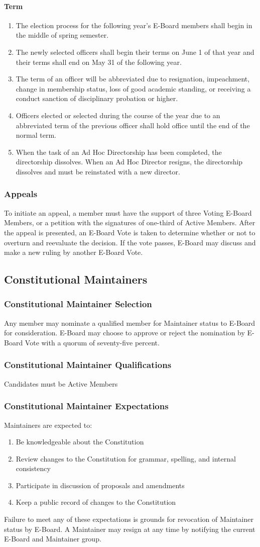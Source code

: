 \documentclass{article}
\newcommand{\asection}[1]{\subsection{#1} \label{#1}}
\newcommand{\asubsection}[1]{\subsubsection{#1} \label{#1}}
\newcommand{\asubsubsection}[1]{\paragraph{#1} \label{#1}}
\begin{document}
\asubsubsection{Term}
\begin{enumerate}
	\item The election process for the following year's E-Board members shall begin in the middle of spring semester.
	\item The newly selected officers shall begin their terms on June 1 of that year and their terms shall end on May 31 of the following year.
	\item The term of an officer will be abbreviated due to resignation, impeachment, change in membership status, loss of good academic standing, or receiving a conduct sanction of disciplinary probation or higher.
	\item Officers elected or selected during the course of the year due to an abbreviated term of the previous officer shall hold office until the end of the normal term.
	\item When the task of an Ad Hoc Directorship has been completed, the directorship dissolves.
	      When an Ad Hoc Director resigns, the directorship dissolves and must be reinstated with a new director.
\end{enumerate}

\asubsection{Appeals}
To initiate an appeal, a member must have the support of three Voting E-Board Members, or a petition with the signatures of one-third of Active Members.
After the appeal is presented, an E-Board Vote is taken to determine whether or not to overturn and reevaluate the decision.
If the vote passes, E-Board may discuss and make a new ruling by another E-Board Vote.

\asection{Constitutional Maintainers}

\asubsection{Constitutional Maintainer Selection}
Any member may nominate a qualified member for Maintainer status to E-Board for consideration.
E-Board may choose to approve or reject the nomination by E-Board Vote with a quorum of seventy-five percent.

\asubsection{Constitutional Maintainer Qualifications}
Candidates must be Active Members

\asubsection{Constitutional Maintainer Expectations}
Maintainers are expected to:
\begin{enumerate}
	\item Be knowledgeable about the Constitution
	\item Review changes to the Constitution for grammar, spelling, and internal consistency
	\item Participate in discussion of proposals and amendments
	\item Keep a public record of changes to the Constitution
\end{enumerate}
Failure to meet any of these expectations is grounds for revocation of Maintainer status by E-Board.
A Maintainer may resign at any time by notifying the current E-Board and Maintainer group.
\end{document}
